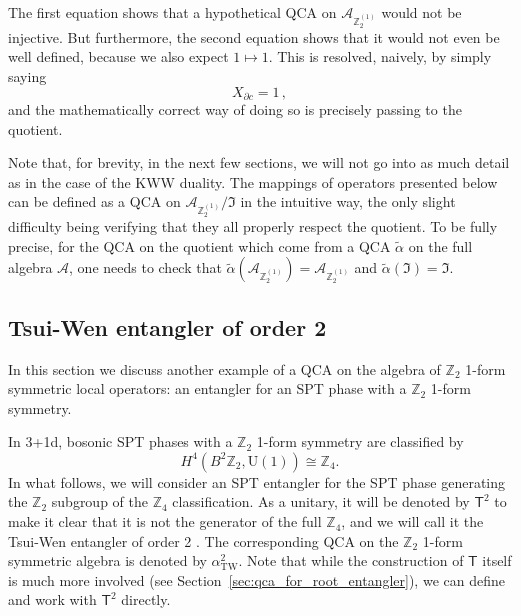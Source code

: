 \documentclass[aps,twocolumn,prx,floatfix,preprintnumbers, nofootinbib,10pt]{revtex4-2}
\numberwithin{equation}{section}
\theoremstyle{definition}
\theoremstyle{remark}
\theoremstyle{claim}
\newcommand{\be}{\begin{equation}}
\newcommand{\ee}{\end{equation}}
\newcommand{\aTW}{\alpha_\text{TW}}
\newcommand{\Z}{{\mathbb Z}}
\newcommand{\mc}[1]{\mathcal{#1}}
\renewcommand{\sf}[1]{\mathsf{#1}}
\begin{document}
The first equation shows that a hypothetical QCA on $\mc{A}_{\Z_2^{(1)}}$ would not be injective. But furthermore, the second equation shows that it would not even be well defined, because we also expect $1 \mapsto 1$. This is resolved, naively, by simply saying
\be
X_{\partial c} = 1 \,,
\ee
and the mathematically correct way of doing so is precisely passing to the quotient.

Note that, for brevity, in the next few sections, we will not go into as much detail as in the case of the KWW duality. The mappings of operators presented below can be defined as a QCA on $\mc{A}_{\Z_2^{(1)}} / \mathfrak{I}$ in the intuitive way, the only slight difficulty being verifying that they all properly respect the quotient. To be fully precise, for the QCA on the quotient which come from a QCA $\tilde{\alpha}$ on the full algebra $\mc{A}$, one needs to check that $\tilde{\alpha}(\mc{A}_{\Z_2^{(1)}}) = \mc{A}_{\Z_2^{(1)}}$ and $\tilde{\alpha}(\mathfrak{I}) = \mathfrak{I}$.

\subsection{Tsui-Wen entangler of order 2}
\label{sec: Z2 TW of order 2}

In this section we discuss another example of a QCA on the algebra of $\mathbb{Z}_2$ 1-form symmetric local operators: an entangler for an SPT phase with a $\mathbb{Z}_2$ 1-form symmetry.

In 3+1d, bosonic SPT phases with a $\mathbb{Z}_2$ 1-form symmetry are classified by~\cite{Kapustin:2013uxa}
\begin{equation}
H^4(B^2\mathbb{Z}_2, \mathrm{U}(1)) \cong \mathbb{Z}_4.
\end{equation}
In what follows, we will consider an SPT entangler for the SPT phase generating the $\mathbb{Z}_2$ subgroup of the $\mathbb{Z}_4$ classification. As a unitary, it will be denoted by $\sf{T}^2$ to make it clear that it is not the generator of the full $\Z_4$, and we will call it the Tsui-Wen entangler of order 2 \cite{Tsui:2019ykk}.
{The corresponding QCA on the $\mathbb{Z}_2$ 1-form symmetric algebra is denoted by $\aTW^2$.}
Note that while the construction of $\sf{T}$ itself is much more involved (see Section~\ref{sec:qca_for_root_entangler}), we can define and work with $\sf{T}^2$ directly.
\end{document}
